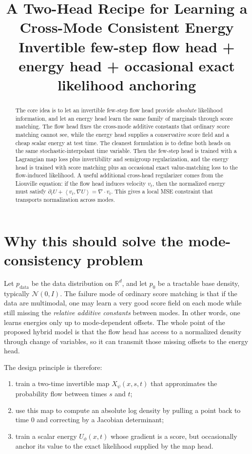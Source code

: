 \documentclass[11pt]{article}
\title{A Two-Head Recipe for Learning a Cross-Mode Consistent Energy\vspace{0.2em}\\
\large Invertible few-step flow head + energy head + occasional exact likelihood anchoring}
\author{}
\date{}
\newcommand{\R}{\mathbb{R}}
\newcommand{\divergence}{\nabla\!\cdot\!}
\newcommand{\inner}[2]{\left\langle #1, #2 \right\rangle}
\newcommand{\grad}{\nabla}
\newcommand{\flow}{X_{\psi}}
\newcommand{\energy}{U_{\phi}}
\begin{document}
\maketitle

\begin{abstract}
The core idea is to let an invertible few-step flow head provide \emph{absolute} likelihood information, and let an energy head learn the same family of marginals through score matching. The flow head fixes the cross-mode additive constants that ordinary score matching cannot see, while the energy head supplies a conservative score field and a cheap scalar energy at test time. The cleanest formulation is to define both heads on the same stochastic-interpolant time variable. Then the few-step head is trained with a Lagrangian map loss plus invertibility and semigroup regularization, and the energy head is trained with score matching plus an occasional exact value-matching loss to the flow-induced likelihood. A useful additional cross-head regularizer comes from the Liouville equation: if the flow head induces velocity $v_t$, then the normalized energy must satisfy $\partial_t U + \inner{v_t}{\grad U} = \divergence v_t$. This gives a local MSE constraint that transports normalization across modes.
\end{abstract}

\section{Why this should solve the mode-consistency problem}

Let $p_{\mathrm{data}}$ be the data distribution on $\R^d$, and let $p_0$ be a tractable base density, typically $\mathcal{N}(0,I)$. The failure mode of ordinary score matching is that if the data are multimodal, one may learn a very good score field on each mode while still missing the \emph{relative additive constants} between modes. In other words, one learns energies only up to mode-dependent offsets. The whole point of the proposed hybrid model is that the flow head has access to a normalized density through change of variables, so it can transmit those missing offsets to the energy head.

The design principle is therefore:
\begin{enumerate}[label=(\roman*),itemsep=0.25em,topsep=0.25em]
    \item train a two-time invertible map $\flow(x,s,t)$ that approximates the probability flow between times $s$ and $t$;
    \item use this map to compute an absolute log density by pulling a point back to time $0$ and correcting by a Jacobian determinant;
    \item train a scalar energy $\energy(x,t)$ whose gradient is a score, but occasionally anchor its value to the exact likelihood supplied by the map head.
\end{enumerate}
\end{document}
